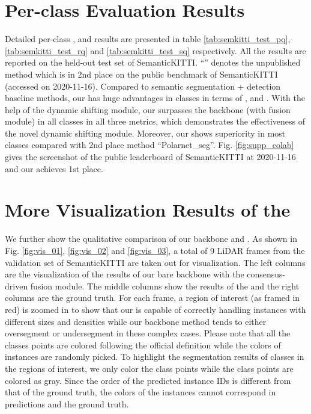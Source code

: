 \documentclass[final]{cvpr}
\begin{document}
\section{Per-class Evaluation Results} \label{sec:5}
Detailed per-class \PQ{}, \RQ{} and \SQ{} results are presented in table \ref{tab:semkitti_test_pq}, \ref{tab:semkitti_test_rq} and \ref{tab:semkitti_test_sq} respectively.
All the results are reported on the held-out test set of SemanticKITTI.
``'' denotes the unpublished method which is in 2nd place on the public benchmark of SemanticKITTI (accessed on 2020-11-16).
Compared to semantic segmentation + detection baseline methods, our \nickname{} has huge advantages in \things{} classes in terms of \PQ{}, \RQ{} and \SQ{}.
With the help of the dynamic shifting module, our \nickname{} surpasses the backbone (with fusion module) in all classes in all three metrics, which demonstrates the effectiveness
of the novel dynamic shifting module.
Moreover, our \nickname{} shows superiority in most classes compared with 2nd place method ``Polarnet\_seg''.
Fig. \ref{fig:supp_colab} gives the screenshot of the public leaderboard of SemanticKITTI at 2020-11-16 and our \nickname{} achieves 1st place.

\section{More Visualization Results of the \nickname{}} \label{sec:6}
We further show the qualitative comparison of our backbone and \nickname{}.
As shown in Fig. \ref{fig:vis_01}, \ref{fig:vis_02} and \ref{fig:vis_03}, a total of 9 LiDAR frames from the validation set of SemanticKITTI are taken out for visualization.
The left columns are the visualization of the results of our bare backbone with the consensus-driven fusion module.
The middle columns show the results of the \nickname{} and the right columns are the ground truth.
For each frame, a region of interest (as framed in red) is zoomed in to show that our \nickname{} is capable of correctly handling instances with different sizes and densities
while our backbone method tends to either oversegment or undersegment in these complex cases.
Please note that all the \stuff{} classes points are colored following the official definition while the colors of \things{} instances are randomly picked.
To highlight the segmentation results of \things{} classes in the regions of interest, we only color the \things{} class points while the \stuff{} class points are colored as gray.
Since the order of the predicted instance IDs is different from that of the ground truth, the colors of the \things{} instances cannot correspond in predictions and the ground truth.
\end{document}
